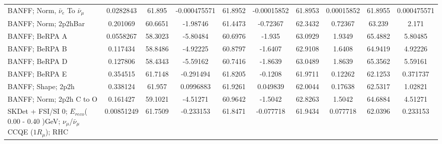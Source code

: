 \begin{tabular}{| l | S | S  S | S  S | S  S | S  S | }
                               BANFF; Norm, $\bar{\nu}_{e}$ To $\bar{\nu}_{\mu}$ &       0.0282843 &          61.895 &    -0.000475571 &         61.8952 &     -0.00015852 &         61.8953 &      0.00015852 &         61.8955 &     0.000475571 \\ 
                                                            BANFF; Norm; 2p2hBar &        0.201069 &         60.6651 &        -1.98746 &         61.4473 &        -0.72367 &         62.3432 &         0.72367 &          63.239 &           2.171 \\ 
                                                                  BANFF; BeRPA A &       0.0558267 &         58.3023 &        -5.80484 &         60.6976 &          -1.935 &         63.0929 &          1.9349 &         65.4882 &         5.80485 \\ 
                                                                  BANFF; BeRPA B &        0.117434 &         58.8486 &        -4.92225 &         60.8797 &         -1.6407 &         62.9108 &          1.6408 &         64.9419 &         4.92226 \\ 
                                                                  BANFF; BeRPA D &        0.127806 &         58.4343 &        -5.59162 &         60.7416 &         -1.8639 &         63.0489 &          1.8639 &         65.3562 &         5.59161 \\ 
                                                                  BANFF; BeRPA E &        0.354515 &         61.7148 &       -0.291494 &         61.8205 &         -0.1208 &         61.9711 &         0.12262 &         62.1253 &        0.371737 \\ 
                                                              BANFF; Shape; 2p2h &        0.338124 &          61.957 &       0.0996883 &         61.9261 &        0.049839 &         62.0044 &         0.17638 &         62.5317 &         1.02821 \\ 
                                                        BANFF; Norm; 2p2h C to O &        0.161427 &         59.1021 &        -4.51271 &         60.9642 &         -1.5042 &         62.8263 &          1.5042 &         64.6884 &         4.51271 \\ 
SKDet + FSI/SI  0; $E_{reco}$( 0.00 - 0.40 )GeV; $\nu_{\mu}$/$\bar{\nu}_{\mu}$ CCQE ($1R_{\mu}$); RHC &      0.00851249 &         61.7509 &       -0.233153 &         61.8471 &       -0.077718 &         61.9434 &        0.077718 &         62.0396 &        0.233153 \\ 

\end{tabular}

